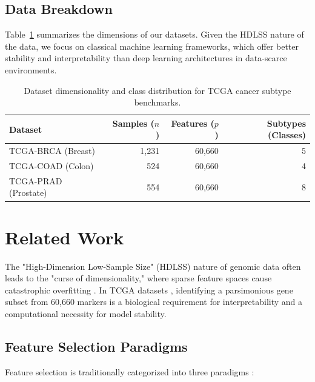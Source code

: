 \documentclass{article}
\begin{document}
\subsection{Data Breakdown}

Table~\ref{tab:datasets} summarizes the dimensions of our datasets. Given the HDLSS nature of the data, we focus on classical machine learning frameworks, which offer better stability and interpretability than deep learning architectures in data-scarce environments.

\begin{table}[htbp]
\centering
\caption{Dataset dimensionality and class distribution for TCGA cancer subtype benchmarks.}
\label{tab:datasets}
\begin{tabular}{@{}lrrr@{}}
\toprule
\textbf{Dataset} & \textbf{Samples ($n$)} & \textbf{Features ($p$)} & \textbf{Subtypes (Classes)} \\
\midrule
TCGA-BRCA (Breast)   & 1,231 & 60,660 & 5 \\
TCGA-COAD (Colon)    & 524   & 60,660 & 4 \\
TCGA-PRAD (Prostate) & 554   & 60,660 & 8 \\
\bottomrule
\end{tabular}
\end{table}











\section{Related Work}

The "High-Dimension Low-Sample Size" (HDLSS) nature of genomic data often leads to the "curse of dimensionality," where sparse feature spaces cause catastrophic overfitting \cite{hdlss_curse}. In TCGA datasets \cite{tcga_resource}, identifying a parsimonious gene subset from 60,660 markers is a biological requirement for interpretability and a computational necessity for model stability.

\subsection{Feature Selection Paradigms}

Feature selection is traditionally categorized into three paradigms \cite{genomic_benchmarking}: 
\end{document}
